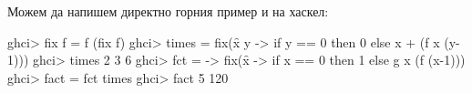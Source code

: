 Можем да напишем директно горния пример и на хаскел:
\begin{haskellcode}
ghci> fix f = f (fix f)
ghci> times = fix(\f x y -> if y == 0 then 0 else x + (f x (y-1)))
ghci> times 2 3
6
ghci> fct = \g -> fix(\f x -> if x == 0 then 1 else g x (f (x-1)))
ghci> fact = fct times
ghci> fact 5
120
\end{haskellcode}

